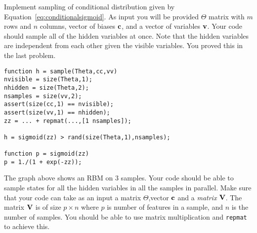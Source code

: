 \documentclass{article}
\begin{document}
Implement sampling of conditional distribution given by Equation~\ref{eq:conditionalsigmoid}.
As input you will be provided $\Theta$ matrix with $m$ rows and $n$ columns, vector of biases $\mathbf{c}$, and a vector of variables $\mathbf{v}$.
Your code should sample all of the hidden variables at once. Note that the hidden variables are independent from each other given the visible variables. You proved this in the last problem.
\begin{verbatim}
function h = sample(Theta,cc,vv)
nvisible = size(Theta,1);
nhidden = size(Theta,2);
nsamples = size(vv,2);
assert(size(cc,1) == nvisible);
assert(size(vv,1) == nhidden);
zz = ... + repmat(...,[1 nsamples]);

h = sigmoid(zz) > rand(size(Theta,1),nsamples);

function p = sigmoid(zz)
p = 1./(1 + exp(-zz));
\end{verbatim}



\begin{center}


\end{center}

The graph above shows an RBM on 3 samples. Your code should be able to sample states for all the hidden variables in all the samples in parallel.
Make sure that your code can take as an input a matrix $\Theta$,vector $\mathbf{c}$ and a {\em matrix} $\mathbf{V}$. The matrix $\mathbf{V}$ is of size $p \times n$ where
$p$ is number of features in a sample, and $n$ is the number of samples. You should be able to use matrix multiplication and \verb|repmat| to achieve this.
\end{document}
